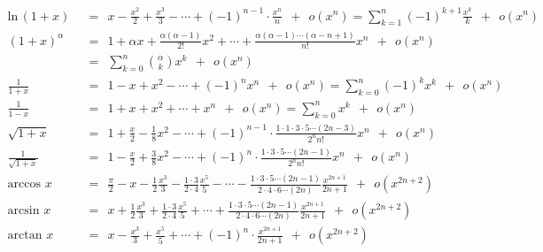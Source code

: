 \documentclass[10pt,class=article,crop=false]{standalone}
\begin{document}
	\begin{align*}
		\text{ln}\, (1+x)&\ \ =\ \
		x - \frac{x^2}{2}+\frac{x^3}{3}- \cdots + (-1)^{n-1}\cdot\frac{x^n}{n}\ \  + \ \ o(x^n)
		= \sum_{k=1}^n (-1)^{k+1} \frac{x^k}{k} \ \  + \ \ o(x^n)
		\\[0.5em]
		(1+x)^\alpha &\ \ =\ \
		1 + \alpha x + \frac{\alpha(\alpha - 1)}{2!}x^2+ \cdots +
		\frac {\alpha(\alpha-1)\cdots(\alpha - n+1)}{n!} x^n \ \  + \ \ o(x^n)\\
		&\ \ =\ \ \sum_{k=0}^n \binom{\alpha}{k} x^k \ \  + \ \ o(x^n)
		\\[1.2em]
		\frac{1}{1+x}&\ \ =\ \
		1 -x+x^2-\cdots+(-1)^n x^n \ \ +\ \ o(x^n)
		= \sum_{k=0}^n (-1)^k x^k \ \ +\ \ o(x^n)
		\\[0.5em]
		\frac{1}{1-x}&\ \ =\ \
		1 + x+x^2+ \cdots+ x^n\ \ +\ \ o(x^n) = \sum_{k=0}^n x^k \ \ +\ \ o(x^n)
		\\[0.5em]
		\sqrt{1+x}&\ \ =\ \
		1 + \frac{x}{2} - \frac{1}{8}x^2- \cdots +
		(-1)^{n-1}\cdot\frac{1\cdot1\cdot3\cdot5\cdots(2n-3)}{2^n n!}x^n\ \  + \ \ o(x^n)
		\\[0.5em]
		\frac{1}{\sqrt{1+x}}&\ \ =\ \
		1 - \frac{x}{2} + \frac{3}{8}x^2- \cdots +
		(-1)^{n}\cdot\frac{1\cdot3\cdot5\cdots(2n-1)}{2^n n!} x^n\ \ + \ \ o(x^n)
		\\[1.2em]
		\text{arccos } x &\ \ =\ \
		\frac{\pi}{2} - x - \frac{1}{2}\frac{x^3}{3} - \frac{1\cdot3}{2\cdot4}\frac{x^5}{5}- \cdots -
		\frac{1\cdot3\cdot5\cdots(2n-1)}{2\cdot4\cdot6\cdots(2n)} \frac{x^{2n+1}}{2n+1}\ \ + \ \ o(x^{2n+2})
		\\[0.5em]
		\text{arcsin } x &\ \ =\ \
		x + \frac{1}{2}\frac{x^3}{3} + \frac{1\cdot3}{2\cdot4}\frac{x^5}{5}+ \cdots +
		\frac{1\cdot3\cdot5\cdots(2n-1)}{2\cdot4\cdot6\cdots(2n)} \frac{x^{2n+1}}{2n+1}\ \ + \ \ o(x^{2n+2})
		\\[0.5em]
		\text{arctan } x &\ \ =\ \
		x - \frac{x^3}{3}+\frac{x^5}{5}+ \cdots + (-1)^{n}\cdot\frac{x^{2n+1}}{2n+1}\ \  + \ \ o(x^{2n+2})
	\end{align*}
\end{document}
